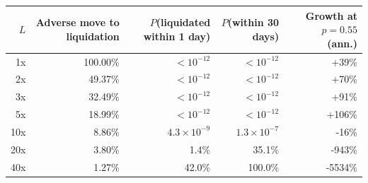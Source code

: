 \begin{tabular}{rrrrr}
\toprule
$L$ & Adverse move to liquidation & $P$(liquidated within 1 day) & $P$(within 30 days) & Growth at $p=0.55$ (ann.) \\
\midrule
1x & 100.00\% & $<10^{-12}$ & $<10^{-12}$ & +39\% \\
2x & 49.37\% & $<10^{-12}$ & $<10^{-12}$ & +70\% \\
3x & 32.49\% & $<10^{-12}$ & $<10^{-12}$ & +91\% \\
5x & 18.99\% & $<10^{-12}$ & $<10^{-12}$ & +106\% \\
10x & 8.86\% & $4.3\times 10^{-9}$ & $1.3\times 10^{-7}$ & -16\% \\
20x & 3.80\% & 1.4\% & 35.1\% & -943\% \\
40x & 1.27\% & 42.0\% & 100.0\% & -5534\% \\
\bottomrule
\end{tabular}